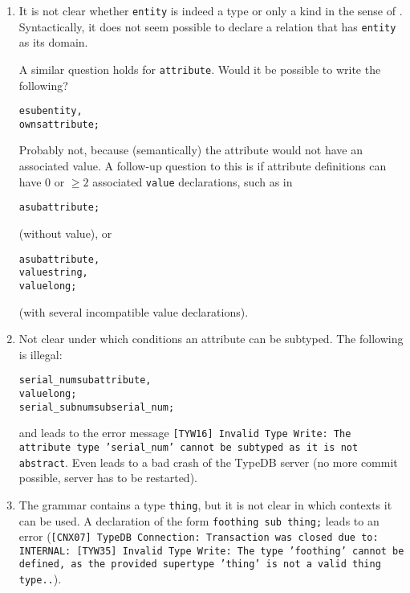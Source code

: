 \documentclass{article}
\begin{document}
\begin{enumerate}

	


\item It is not clear whether \texttt{entity} is indeed a type or only a kind
  in the sense of . Syntactically, it does not
  seem possible to declare a relation that has \texttt{entity} as its domain.

  A similar question holds for \texttt{attribute}. Would it be possible to
  write the following?

  \begin{alltt}
  e sub entity,
    owns attribute;
  \end{alltt}

  Probably not, because (semantically) the attribute would not have an
  associated value. A follow-up question to this is if attribute definitions
  can have 0 or $\geq 2$ associated \texttt{value} declarations, such as in
  \begin{alltt}
    a sub attribute;
  \end{alltt}
  (without value),  or
  \begin{alltt}
    a sub attribute,
    value string,
    value long;
  \end{alltt}
  (with several incompatible value declarations).

\item Not clear under which conditions an attribute can be subtyped. The
  following is illegal:
  \begin{alltt}
serial_num sub attribute,
    value long;
serial_subnum sub serial_num;
  \end{alltt}
  
  and leads to the error message \texttt{[TYW16] Invalid Type Write: The
    attribute type 'serial\_num' cannot be subtyped as it is not abstract}.
  Even leads to a bad crash of the TypeDB server (no more commit possible,
  server has to be restarted). 

  
\item The grammar contains a type \texttt{thing}, but it is not clear in which
  contexts it can be used. A declaration of the form \texttt{foothing sub
    thing;} leads to an error (\texttt{[CNX07] TypeDB Connection: Transaction
    was closed due to: INTERNAL: [TYW35] Invalid Type Write: The type
    'foothing' cannot be defined, as the provided supertype 'thing' is not a
    valid thing type..}).

\end{enumerate}
\end{document}
